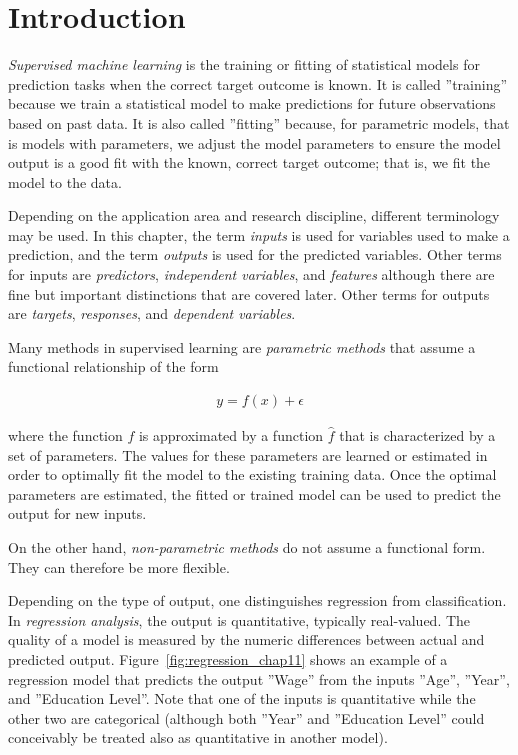 \section{Introduction}

\emph{Supervised machine learning} is the training or fitting of statistical models for prediction tasks when the correct target outcome is known. It is called ''training'' because we train a statistical model to make predictions for future observations based on past data. It is also called ''fitting'' because, for parametric models, that is models with parameters, we adjust the model parameters to ensure the model output is a good fit with the known, correct target outcome; that is, we fit the model to the data. 

Depending on the application area and research discipline, different terminology may be used. In this chapter, the term \emph{inputs} is used for variables used to make a prediction, and the term \emph{outputs} is used for the predicted variables. Other terms for inputs are \emph{predictors}, \emph{independent variables}, and \emph{features} although there are fine but important distinctions that are covered later. Other terms for outputs are \emph{targets}, \emph{responses}, and \emph{dependent variables}.

Many methods in supervised learning are \emph{parametric methods} that assume a functional relationship of the form 

\begin{align*}
y = f(x) + \epsilon
\end{align*}

\noindent where the function $f$ is approximated by a function $\hat{f}$ that is characterized by a set of parameters. The values for these parameters are learned or estimated in order to optimally fit the model to the existing training data. Once the optimal parameters are estimated, the fitted or trained model can be used to predict the output for new inputs.

On the other hand, \emph{non-parametric methods} do not assume a functional form. They can therefore be more flexible. 

Depending on the type of output, one distinguishes regression from classification. In \emph{regression analysis}, the output is quantitative, typically real-valued. The quality of a model is measured by the numeric differences between actual and predicted output. Figure~\ref{fig:regression_chap11} shows an example of a regression model that predicts the output ''Wage'' from the inputs ''Age'', ''Year'', and ''Education Level''. Note that one of the inputs is quantitative while the other two are categorical (although both ''Year'' and ''Education Level'' could conceivably be treated also as quantitative in another model).


